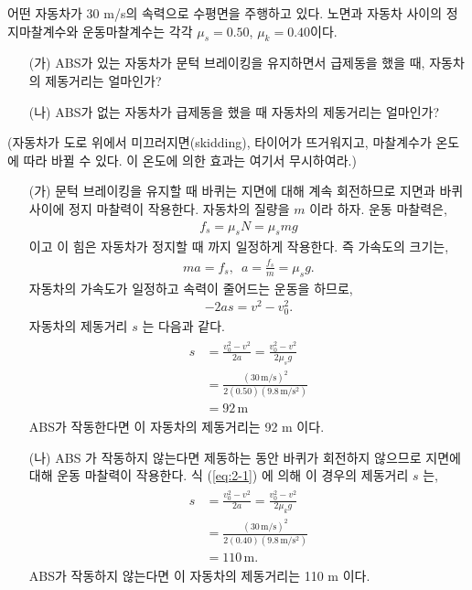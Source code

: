 \documentclass[floatfix,nofootinbib,superscriptaddress,fleqn]{revtex4-2}
\begin{document}
어떤 자동차가 30 m/s의 속력으로 수평면을 주행하고 있다. 노면과 자동차
사이의 정지마찰계수와 운동마찰계수는 각각 $\mu_s=0.50$,
$\mu_k=0.40$이다. 
\begin{itemize}
\item[(가)] ABS가 있는 자동차가 문턱 브레이킹을 유지하면서 급제동을
  했을 때, 자동차의 제동거리는 얼마인가?
\item[(나)] ABS가 없는 자동차가 급제동을 했을 때 자동차의 제동거리는
  얼마인가?   
\end{itemize}
(자동차가 도로 위에서 미끄러지면(skidding), 타이어가 뜨거워지고,
마찰계수가 온도에 따라 바뀔 수 있다. 이 온도에 의한 효과는 여기서 무시하여라.)

\begin{itemize}
  \item[(가)] 문턱 브레이킹을 유지할 때 바퀴는 지면에 대해 계속 회전하므로 지면과 
  바퀴 사이에 정지 마찰력이 작용한다. 자동차의 질량을 $m$ 이라 하자. 운동 마찰력은,
  \begin{align}
    f_s = \mu_s N = \mu_s mg
  \end{align} 
이고 이 힘은 자동차가 정지할 때 까지 일정하게 작용한다. 즉 가속도의 크기는,
\begin{align}
  ma = f_s,\,\,\, a = \frac{f_s}{m}=\mu_s g.
\end{align}
자동차의 가속도가 일정하고 속력이 줄어드는 운동을 하므로,
\begin{align}
  -2as = v^2-v^2_0.
\end{align}
자동차의 제동거리 $s$ 는 다음과 같다.
\begin{align}
  \begin{split}\label{eq:2-1}
    s &= \frac{v^2_0-v^2}{2a} = \frac{v^2_0-v^2}{2\mu_s g}  \\
    &= \frac{(30\,\mathrm{m/s})^2}{2(0.50)(9.8\,\mathrm{m/s^2})}  \\
    &= 92\,\mathrm{m}
  \end{split}
\end{align}
ABS가 작동한다면 이 자동차의 제동거리는 92 m 이다.
  \item[(나)] ABS 가 작동하지 않는다면 제동하는 동안 바퀴가 회전하지 않으므로 
  지면에 대해 운동 마찰력이 작용한다. 식 (\ref{eq:2-1}) 에 의해 이 경우의 
  제동거리 $s$ 는,
  \begin{align}
    \begin{split}
      s &= \frac{v^2_0-v^2}{2a} = \frac{v^2_0-v^2}{2\mu_k g}  \\
      &= \frac{(30\,\mathrm{m/s})^2}{2(0.40)(9.8\,\mathrm{m/s^2})}  \\
      &= 110\,\mathrm{m}.
    \end{split}
  \end{align}
  ABS가 작동하지 않는다면 이 자동차의 제동거리는 110 m 이다.
\end{itemize}
\end{document}
